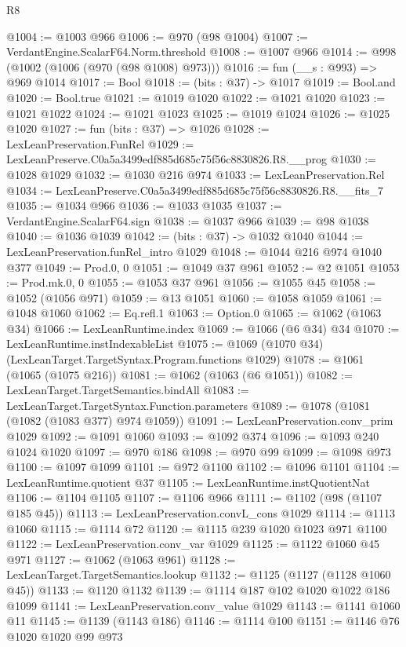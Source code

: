 \begin{lexlean}{R8}
\begin{coremodule}
@1004 := @1003 @966
@1006 := @970 (@98 @1004)
@1007 := VerdantEngine.ScalarF64.Norm.threshold
@1008 := @1007 @966
@1014 := @998 (@1002 (@1006 (@970 (@98 @1008) @973)))
@1016 := fun (__s : @993) => @969 @1014
@1017 := Bool
@1018 := (bits : @37) -> @1017
@1019 := Bool.and
@1020 := Bool.true
@1021 := @1019 @1020
@1022 := @1021 @1020
@1023 := @1021 @1022
@1024 := @1021 @1023
@1025 := @1019 @1024
@1026 := @1025 @1020
@1027 := fun (bits : @37) => @1026
@1028 := LexLeanPreservation.FunRel
@1029 := LexLeanPreserve.C0a5a3499edf885d685c75f56c8830826.R8.__prog
@1030 := @1028 @1029
@1032 := @1030 @216 @974
@1033 := LexLeanPreservation.Rel
@1034 := LexLeanPreserve.C0a5a3499edf885d685c75f56c8830826.R8.__fits_7
@1035 := @1034 @966
@1036 := @1033 @1035
@1037 := VerdantEngine.ScalarF64.sign
@1038 := @1037 @966
@1039 := @98 @1038
@1040 := @1036 @1039
@1042 := (bits : @37) -> @1032 @1040
@1044 := LexLeanPreservation.funRel_intro @1029
@1048 := @1044 @216 @974 @1040 @377
@1049 := Prod.{0, 0}
@1051 := @1049 @37 @961
@1052 := @2 @1051
@1053 := Prod.mk.{0, 0}
@1055 := @1053 @37 @961
@1056 := @1055 @45
@1058 := @1052 (@1056 @971)
@1059 := @13 @1051
@1060 := @1058 @1059
@1061 := @1048 @1060
@1062 := Eq.refl.{1}
@1063 := Option.{0}
@1065 := @1062 (@1063 @34)
@1066 := LexLeanRuntime.index
@1069 := @1066 (@6 @34) @34
@1070 := LexLeanRuntime.instIndexableList
@1075 := @1069 (@1070 @34) (LexLeanTarget.TargetSyntax.Program.functions @1029)
@1078 := @1061 (@1065 (@1075 @216))
@1081 := @1062 (@1063 (@6 @1051))
@1082 := LexLeanTarget.TargetSemantics.bindAll
@1083 := LexLeanTarget.TargetSyntax.Function.parameters
@1089 := @1078 (@1081 (@1082 (@1083 @377) @974 @1059))
@1091 := LexLeanPreservation.conv_prim @1029
@1092 := @1091 @1060
@1093 := @1092 @374
@1096 := @1093 @240 @1024 @1020
@1097 := @970 @186
@1098 := @970 @99
@1099 := @1098 @973
@1100 := @1097 @1099
@1101 := @972 @1100
@1102 := @1096 @1101
@1104 := LexLeanRuntime.quotient @37
@1105 := LexLeanRuntime.instQuotientNat
@1106 := @1104 @1105
@1107 := @1106 @966
@1111 := @1102 (@98 (@1107 @185 @45))
@1113 := LexLeanPreservation.convL_cons @1029
@1114 := @1113 @1060
@1115 := @1114 @72
@1120 := @1115 @239 @1020 @1023 @971 @1100
@1122 := LexLeanPreservation.conv_var @1029
@1125 := @1122 @1060 @45 @971
@1127 := @1062 (@1063 @961)
@1128 := LexLeanTarget.TargetSemantics.lookup
@1132 := @1125 (@1127 (@1128 @1060 @45))
@1133 := @1120 @1132
@1139 := @1114 @187 @102 @1020 @1022 @186 @1099
@1141 := LexLeanPreservation.conv_value @1029
@1143 := @1141 @1060 @11
@1145 := @1139 (@1143 @186)
@1146 := @1114 @100
@1151 := @1146 @76 @1020 @1020 @99 @973

\end{coremodule}
\end{lexlean}
